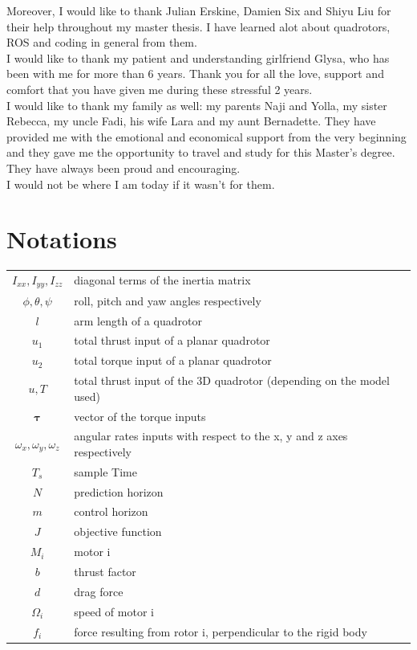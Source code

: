 \documentclass{thesisreport}
\begin{document}
Moreover, I would like to thank Julian Erskine, Damien Six and Shiyu Liu for their help throughout my master thesis. I have learned alot about quadrotors, ROS and coding in general from them. \\

I would like to thank my patient and understanding girlfriend Glysa, who has been with me for more than 6 years. Thank you for all the love, support and comfort that you have given me during these stressful 2 years. \\

I would like to thank my family as well: my parents Naji and Yolla, my sister Rebecca, my uncle Fadi, his wife Lara and my aunt Bernadette. They have provided me with the emotional and economical support from the very beginning and they gave me the opportunity to travel and study for this Master's degree. They have always been proud and encouraging. \\I would not be where I am today if it wasn't for them.
 
 \newpage
 
 
 \section*{Notations}
  \begin{tabular}{cp{}}
  $I_{xx}, I_{yy}, I_{zz}$ & diagonal terms of the inertia matrix\\
  $\phi, \theta, \psi$ & roll, pitch and yaw angles respectively\\
  $l$ & arm length of a quadrotor \\
  $u_1$ & total thrust input of a planar quadrotor \\
  $u_2$ & total torque input of a planar quadrotor \\
  $u, T$ & total thrust input of the 3D quadrotor (depending on the model used)\\  
  $\bm{\tau}$ & vector of the torque inputs \\
  $\omega_x, \omega_y, \omega_z$ & angular rates inputs with respect to the x, y and z axes respectively \\
  $T_s$ & sample Time \\
  $N$ & prediction horizon \\
  $m$ & control horizon \\
  $J$ & objective function \\
  $M_i$ & motor i \\
  $b$ & thrust factor \\
  $d$ & drag force \\
  $\Omega_i$ & speed of motor i \\
  $f_i$ & force resulting from rotor i, perpendicular to the rigid body \\
  
  

\end{tabular}\\
 \newpage
 
\end{document}
